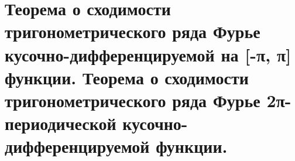{
	\section{Теорема о сходимости тригонометрического ряда Фурье кусочно-дифференцируемой на [-π, π] функции. Теорема
	о сходимости тригонометрического ряда Фурье 2π-периодической кусочно-дифференцируемой функции.}

	\newpage
}
